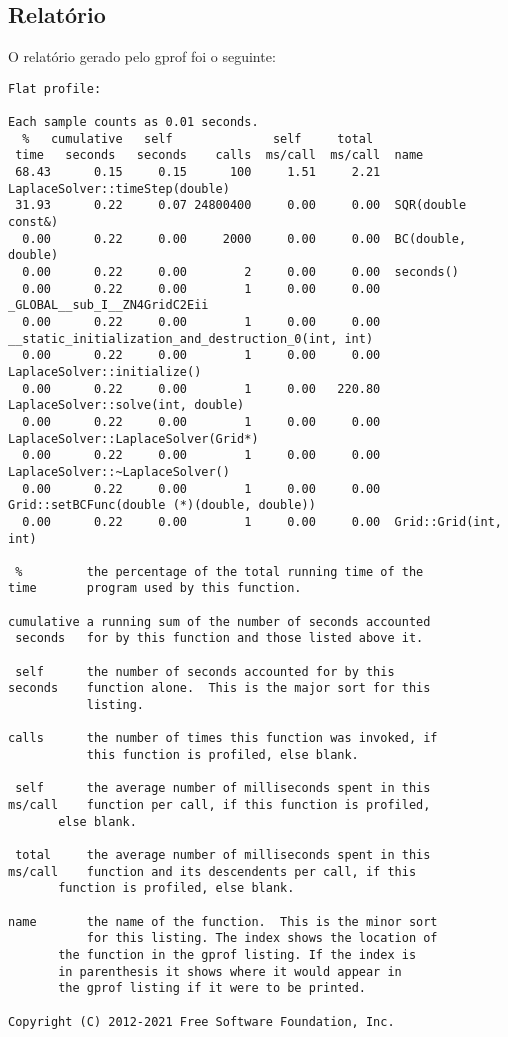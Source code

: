 \documentclass[a4paper,twosidep]{article}
\begin{document}
\subsection{Relatório}
\label{sec:org988dcb0}
O relatório gerado pelo gprof foi o seguinte:
\begin{verbatim}
Flat profile:

Each sample counts as 0.01 seconds.
  %   cumulative   self              self     total
 time   seconds   seconds    calls  ms/call  ms/call  name
 68.43      0.15     0.15      100     1.51     2.21  LaplaceSolver::timeStep(double)
 31.93      0.22     0.07 24800400     0.00     0.00  SQR(double const&)
  0.00      0.22     0.00     2000     0.00     0.00  BC(double, double)
  0.00      0.22     0.00        2     0.00     0.00  seconds()
  0.00      0.22     0.00        1     0.00     0.00  _GLOBAL__sub_I__ZN4GridC2Eii
  0.00      0.22     0.00        1     0.00     0.00  __static_initialization_and_destruction_0(int, int)
  0.00      0.22     0.00        1     0.00     0.00  LaplaceSolver::initialize()
  0.00      0.22     0.00        1     0.00   220.80  LaplaceSolver::solve(int, double)
  0.00      0.22     0.00        1     0.00     0.00  LaplaceSolver::LaplaceSolver(Grid*)
  0.00      0.22     0.00        1     0.00     0.00  LaplaceSolver::~LaplaceSolver()
  0.00      0.22     0.00        1     0.00     0.00  Grid::setBCFunc(double (*)(double, double))
  0.00      0.22     0.00        1     0.00     0.00  Grid::Grid(int, int)

 %         the percentage of the total running time of the
time       program used by this function.

cumulative a running sum of the number of seconds accounted
 seconds   for by this function and those listed above it.

 self      the number of seconds accounted for by this
seconds    function alone.  This is the major sort for this
           listing.

calls      the number of times this function was invoked, if
           this function is profiled, else blank.

 self      the average number of milliseconds spent in this
ms/call    function per call, if this function is profiled,
	   else blank.

 total     the average number of milliseconds spent in this
ms/call    function and its descendents per call, if this
	   function is profiled, else blank.

name       the name of the function.  This is the minor sort
           for this listing. The index shows the location of
	   the function in the gprof listing. If the index is
	   in parenthesis it shows where it would appear in
	   the gprof listing if it were to be printed.

Copyright (C) 2012-2021 Free Software Foundation, Inc.


\end{verbatim}
\end{document}

